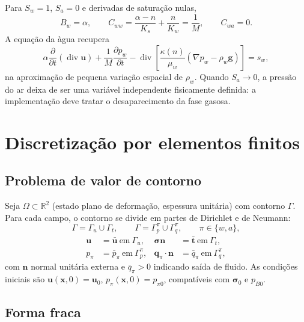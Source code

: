 \documentclass[11pt,a4paper]{article}
\newcommand{\Div}{\operatorname{div}}
\begin{document}
Para $S_w=1$, $S_a=0$ e derivadas de satura\c{c}\~ao nulas,
\begin{equation*}
B_w=\alpha,\qquad
C_{ww}=\frac{\alpha-n}{K_s}+\frac{n}{K_w}=\frac1M,\qquad
C_{wa}=0.
\end{equation*}
A equa\c{c}\~ao da \`agua recupera
\begin{equation*}
\boxed{\alpha\frac{\partial}{\partial t}(\Div\mathbf u)
+\frac1M\frac{\partial p_w}{\partial t}
-\Div\left[\frac{\kappa(n)}{\mu_w}
(\nabla p_w-\rho_w\mathbf g)\right]=s_w,}
\end{equation*}
na aproxima\c{c}\~ao de pequena varia\c{c}\~ao espacial de
$\rho_w$. Quando $S_a\to0$, a press\~ao do ar deixa de ser uma vari\'avel
independente fisicamente definida: a implementa\c{c}\~ao deve tratar
o desaparecimento da fase gasosa.

\section{Discretização por elementos finitos}

\subsection{Problema de valor de contorno}

Seja $\Omega\subset\mathbb R^{2}$ (estado plano de deformação, espessura
unitária) com contorno $\Gamma$. Para cada campo, o contorno se divide em
partes de Dirichlet e de Neumann:
\begin{equation*}
\Gamma=\Gamma_u\cup\Gamma_t,\qquad
\Gamma=\Gamma_p^{\pi}\cup\Gamma_q^{\pi},\qquad \pi\in\{w,a\},
\end{equation*}
\begin{equation*}
\boxed{\begin{aligned}
\mathbf u&=\bar{\mathbf u}\ \text{em}\ \Gamma_u, &
\boldsymbol\sigma\mathbf n&=\bar{\mathbf t}\ \text{em}\ \Gamma_t,\\
p_\pi&=\bar p_\pi\ \text{em}\ \Gamma_p^{\pi}, &
\mathbf q_\pi\cdot\mathbf n&=\bar q_\pi\ \text{em}\ \Gamma_q^{\pi},
\end{aligned}}
\end{equation*}
com $\mathbf n$ normal unitária externa e $\bar q_\pi>0$ indicando saída
de fluido. As condições iniciais são $\mathbf u(\mathbf x,0)=\mathbf u_0$,
$p_\pi(\mathbf x,0)=p_{\pi0}$, compatíveis com $\boldsymbol\sigma_0$ e
$p_{B0}$.

\subsection{Forma fraca}
\end{document}
